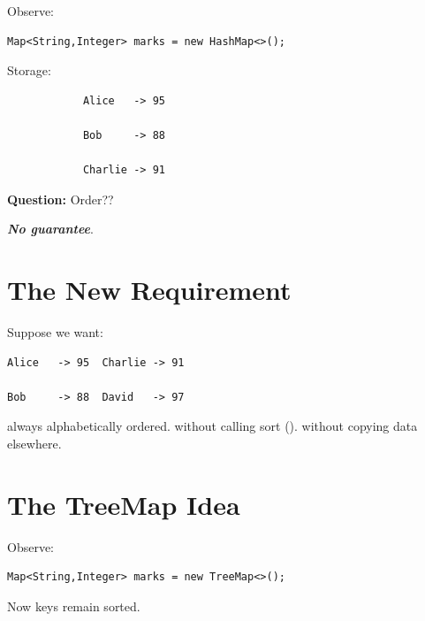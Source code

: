 \documentclass[11pt,a4paper]{book}
\newcommand{\question}[1]{
\vspace{0.5em}
\textbf{Question:} #1?
\vspace{0.2em}
}
\begin{document}
Observe:

\begin{verbatim} 
Map<String,Integer> marks = new HashMap<>();
\end{verbatim}


Storage:

\begin{verbatim}
            Alice   -> 95
            
            Bob     -> 88
            
            Charlie -> 91
\end{verbatim}



\question{Order?}

\textcolor{RosettaBlue}{\textbf{\emph{No guarantee}}}.

\section{The New Requirement}

Suppose we want:

\begin{verbatim}
Alice   -> 95  Charlie -> 91

Bob     -> 88  David   -> 97
\end{verbatim}


always alphabetically ordered.
without calling sort ().
without copying data elsewhere.


\section{The TreeMap Idea}

Observe:

\begin{verbatim} 
Map<String,Integer> marks = new TreeMap<>();
\end{verbatim}


Now keys remain sorted.

\end{document}
